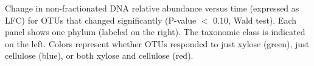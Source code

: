 Change in non-fractionated DNA relative abundance versus time (expressed as
LFC) for OTUs that changed significantly (P-value $<$ 0.10, Wald test). Each
panel shows one phylum (labeled on the right). The taxonomic class is indicated
on the left. Colors represent whether OTUs responded to just xylose (green),
just cellulose (blue), or both xylose and cellulose (red).

